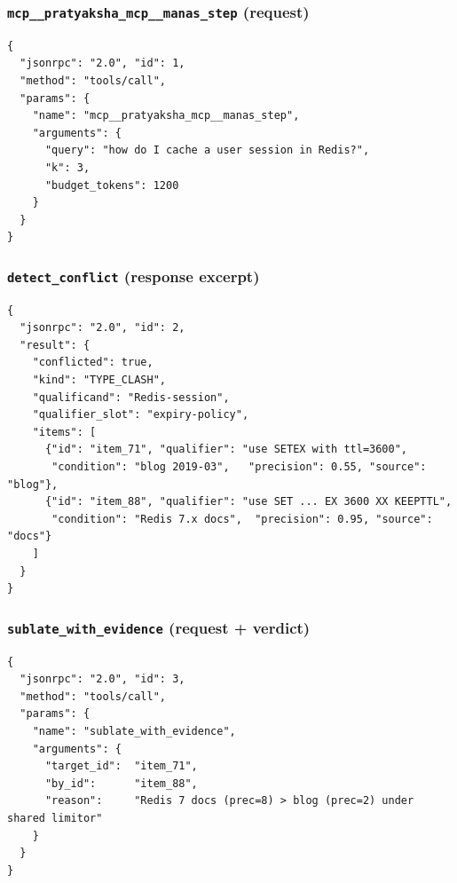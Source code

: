 \subsubsection{\texorpdfstring{\texttt{mcp\_\_pratyaksha\_mcp\_\_manas\_step} (request)}{mcp\_\_pratyaksha\_mcp\_\_manas\_step (request)}}\label{mcp__pratyaksha_mcp__manas_step-request}

\begin{lstlisting}
{
  "jsonrpc": "2.0", "id": 1,
  "method": "tools/call",
  "params": {
    "name": "mcp__pratyaksha_mcp__manas_step",
    "arguments": {
      "query": "how do I cache a user session in Redis?",
      "k": 3,
      "budget_tokens": 1200
    }
  }
}
\end{lstlisting}

\subsubsection{\texorpdfstring{\texttt{detect\_conflict} (response excerpt)}{detect\_conflict (response excerpt)}}\label{detect_conflict-response-excerpt}

\begin{lstlisting}
{
  "jsonrpc": "2.0", "id": 2,
  "result": {
    "conflicted": true,
    "kind": "TYPE_CLASH",
    "qualificand": "Redis-session",
    "qualifier_slot": "expiry-policy",
    "items": [
      {"id": "item_71", "qualifier": "use SETEX with ttl=3600",
       "condition": "blog 2019-03",   "precision": 0.55, "source": "blog"},
      {"id": "item_88", "qualifier": "use SET ... EX 3600 XX KEEPTTL",
       "condition": "Redis 7.x docs",  "precision": 0.95, "source": "docs"}
    ]
  }
}
\end{lstlisting}

\subsubsection{\texorpdfstring{\texttt{sublate\_with\_evidence} (request + verdict)}{sublate\_with\_evidence (request + verdict)}}\label{sublate_with_evidence-request-verdict}

\begin{lstlisting}
{
  "jsonrpc": "2.0", "id": 3,
  "method": "tools/call",
  "params": {
    "name": "sublate_with_evidence",
    "arguments": {
      "target_id":  "item_71",
      "by_id":      "item_88",
      "reason":     "Redis 7 docs (prec=8) > blog (prec=2) under shared limitor"
    }
  }
}
\end{lstlisting}

